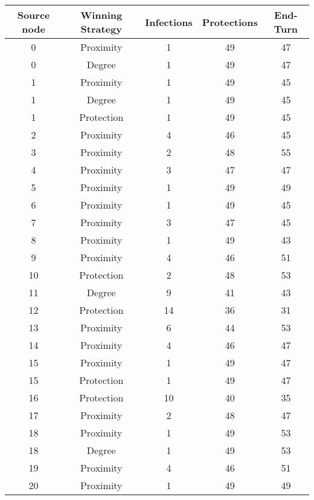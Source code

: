 \documentclass[results.tex]{subfiles}
\begin{document}
\begin{center}
  \begin{tabular}{| c || c | c | c | c |}
    \hline
    {\bfseries Source node} & {\bfseries Winning Strategy} & {\bfseries Infections} & {\bfseries Protections} & {\bfseries End-Turn} \\  %
    \hline\hline
    0 & Proximity & 1 & 49 & 47 \\ 
    \hline
    0 & Degree & 1 & 49 & 47 \\ 
    \hline
    1 & Proximity & 1 & 49 & 45 \\ 
    \hline
    1 & Degree & 1 & 49 & 45 \\ 
    \hline
    1 & Protection & 1 & 49 & 45 \\ 
    \hline
    2 & Proximity & 4 & 46 & 45 \\ 
    \hline
    3 & Proximity & 2 & 48 & 55 \\ 
    \hline
    4 & Proximity & 3 & 47 & 47 \\ 
    \hline
    5 & Proximity & 1 & 49 & 49 \\ 
    \hline
    6 & Proximity & 1 & 49 & 45 \\ 
    \hline
    7 & Proximity & 3 & 47 & 45 \\ 
    \hline
    8 & Proximity & 1 & 49 & 43 \\ 
    \hline
    9 & Proximity & 4 & 46 & 51 \\ 
    \hline
    10 & Protection & 2 & 48 & 53 \\ 
    \hline
    11 & Degree & 9 & 41 & 43 \\ 
    \hline
    12 & Protection & 14 & 36 & 31 \\ 
    \hline
    13 & Proximity & 6 & 44 & 53 \\ 
    \hline
    14 & Proximity & 4 & 46 & 47 \\ 
    \hline
    15 & Proximity & 1 & 49 & 47 \\ 
    \hline
    15 & Protection & 1 & 49 & 47 \\ 
    \hline
    16 & Protection & 10 & 40 & 35 \\ 
    \hline
    17 & Proximity & 2 & 48 & 47 \\ 
    \hline
    18 & Proximity & 1 & 49 & 53 \\ 
    \hline
    18 & Degree & 1 & 49 & 53 \\ 
    \hline
    19 & Proximity & 4 & 46 & 51 \\ 
    \hline
    20 & Proximity & 1 & 49 & 49 \\ 

\end{tabular}
\end{center}
\end{document}
